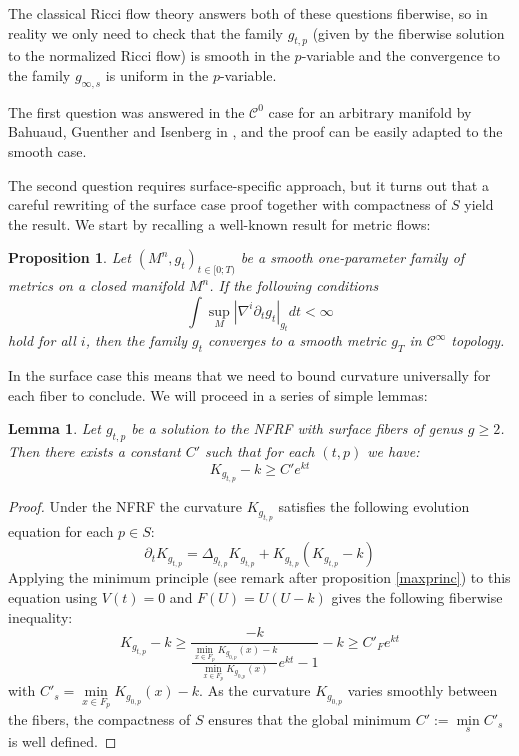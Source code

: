 \documentclass{article}
\theoremstyle{plain}
\newtheorem{lem}{Lemma}[section]
\newtheorem{prop}{Proposition}[section]
\theoremstyle{remark}
\theoremstyle{definition}
\begin{document}
The classical Ricci flow theory answers both of these questions fiberwise, so in reality we only need to check that the family $g_{t,p}$ (given by the fiberwise solution to the normalized Ricci flow) is smooth in the $p$-variable and the convergence to the family $g_{\infty, s}$ is uniform in the $p$-variable. \par 
The first question was answered in the $\mathcal{C}^0$ case for an arbitrary manifold by Bahuaud, Guenther and Isenberg in \cite{shorttime}, and the proof can be easily adapted to the smooth case. \par 
The second question requires surface-specific approach, but it turns out that a careful rewriting of the surface case proof together with compactness of $S$ yield the result.  We start by recalling a well-known result for metric flows\thinspace:
\begin{prop}
    Let $(M^n,g_t)_{t\in[0;T)}$ be a smooth one-parameter family of metrics on a closed manifold $M^n$. If the following conditions 
    $$\int \underset{M}{\sup} |\nabla^i \partial_t g_t|_{g_t}dt <\infty$$
    hold for all $i$, then the family $g_t$ converges to a smooth metric $g_T$ in $\mathcal{C^\infty}$ topology.
\end{prop}
In the surface case this means that we need to bound curvature universally for each fiber to conclude. We will proceed in a series of simple lemmas\thinspace:
\begin{lem}
    Let $g_{t,p}$ be a solution to the NFRF with surface fibers of genus $g\geq 2$. Then there exists a constant $C'$ such that for each $(t,p)$ we have\thinspace:
    $$K_{g_{t,p}}-k \geq C' e^{kt}$$
\end{lem}
\begin{proof}
    Under the NFRF the curvature $K_{g_{t,p}}$ satisfies the following evolution equation for each $p\in S$\thinspace:
    $$\partial_t K_{g_{t,p}} = \Delta_{g_{t,p}}K_{g_{t,p}} + K_{g_{t,p}} (K_{g_{t,p}}-k)$$
    Applying the minimum principle (see remark after proposition \ref{maxprinc}) to this equation using $V(t)=0$ and $F(U)=U(U-k)$ gives the following fiberwise inequality\thinspace:
    $$K_{g_{t,p}}-k \geq \frac{-k}{\frac{\underset{x\in F_p}{\min} K_{g_{0,p}}(x)-k}{\underset{x\in F_p}{\min} K_{g_{0,p}}(x)}e^{kt}-1}-k \geq C'_F e^{kt}$$
    with $C'_s = \underset{x\in F_p}{\min} K_{g_{0,p}}(x)-k$. As the curvature $K_{g_{0,p}}$ varies smoothly between the fibers, the compactness of $S$ ensures that the global minimum $C':=\underset{s}{\min} C'_s$ is well defined.
\end{proof}
\end{document}
